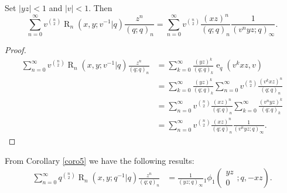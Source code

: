 \documentclass{cimart}
\DeclareMathOperator{\ope}{e}
\DeclareMathOperator{\opR}{R}
\begin{document}
\begin{corollary}\label{coro5}
Set $\vert yz\vert<1$ and $\vert v\vert<1$. Then
    \begin{equation}
        \sum_{n=0}^{\infty}v^{\binom{n}{2}}\opR_{n}(x,y;v^{-1}|q)\frac{z^n}{(q;q)_{n}}=\sum_{n=0}^{\infty}v^{\binom{n}{2}}\frac{(xz)^{n}}{(q;q)_{n}}\frac{1}{(v^nyz;q)_{\infty}}.
    \end{equation}
\end{corollary}
\begin{proof}
    \begin{align*}
        \sum_{n=0}^{\infty}v^{\binom{n}{2}}\opR_{n}(x,y;v^{-1}|q)\frac{z^n}{(q;q)_{n}}&=\sum_{k=0}^{\infty}\frac{(yz)^k}{(q;q)_{k}}\ope_{q}\left(v^{k}xz,v\right)\\
        &=\sum_{k=0}^{\infty}\frac{(yz)^k}{(q;q)_{k}}\sum_{n=0}^{\infty}v^{\binom{n}{2}}\frac{(v^{k}xz)^n}{(q;q)_{n}}\\
        &=\sum_{n=0}^{\infty}v^{\binom{n}{2}}\frac{(xz)^{n}}{(q;q)_{n}}\sum_{k=0}^{\infty}\frac{(v^nyz)^k}{(q;q)_{k}}\\
        &=\sum_{n=0}^{\infty}v^{\binom{n}{2}}\frac{(xz)^{n}}{(q;q)_{n}}\frac{1}{(v^nyz;q)_{\infty}}.
    \end{align*}
\end{proof}
From Corollary \ref{coro5} we have the following results:
\begin{align}\label{eqn_qRq-}
    \sum_{n=0}^{\infty}q^{\binom{n}{2}}\opR_{n}(x,y;q^{-1}|q)\frac{z^n}{(q;q)_{n}}&=\frac{1}{(yz;q)_{\infty}}{}_{1}\phi_{1}\left(
        \begin{array}{c}
             yz \\
             0
        \end{array};
        q,-xz
        \right).
\end{align}
\end{document}
